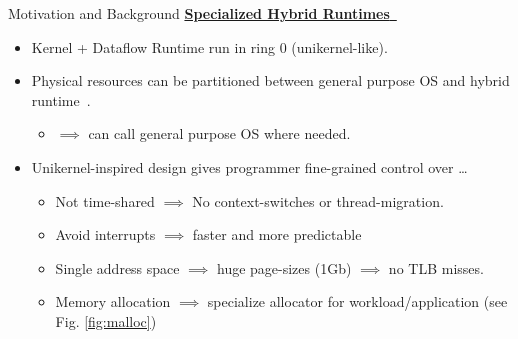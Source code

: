 \begin{block}{Motivation and Background}
  \underline{\textbf{Specialized Hybrid Runtimes}~\cite{HALE:2015:NAUTILUS}}
    \begin{itemize}
    \item Kernel + Dataflow Runtime run in ring 0 (unikernel-like).
    \item Physical resources can be partitioned between general purpose OS and hybrid runtime~\cite{KOCOLOSKI:2015:PISCES}.
      \begin{itemize}
      \item $\implies$ can call general purpose OS where needed.
      \end{itemize}

    \item {Unikernel-inspired design gives programmer fine-grained control over \ldots}
      \begin{itemize}
      \item Not time-shared $\implies$ No context-switches or thread-migration.
      \item Avoid interrupts $\implies$ faster and more predictable
      \item Single address space $\implies$ huge page-sizes (1Gb) $\implies$ no TLB misses.
      \item Memory allocation $\implies$ specialize allocator for workload/application (see Fig. \ref{fig:malloc})
      \end{itemize}
    \end{itemize}
  

\end{block}
